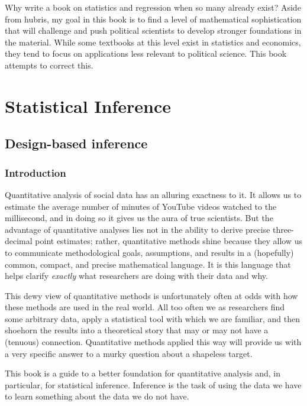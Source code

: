 \documentclass[
  letterpaper,
  DIV=11,
  numbers=noendperiod]{scrreprt}
\theoremstyle{plain}
\theoremstyle{definition}
\theoremstyle{definition}
\theoremstyle{remark}
\begin{document}
Why write a book on statistics and regression when so many already
exist? Aside from hubris, my goal in this book is to find a level of
mathematical sophistication that will challenge and push political
scientists to develop stronger foundations in the material. While some
textbooks at this level exist in statistics and economics, they tend to
focus on applications less relevant to political science. This book
attempts to correct this.

\part{Statistical Inference}

\hypertarget{design-based-inference}{%
\chapter{Design-based inference}\label{design-based-inference}}

\hypertarget{introduction-1}{%
\section{Introduction}\label{introduction-1}}

Quantitative analysis of social data has an alluring exactness to it. It
allows us to estimate the average number of minutes of YouTube videos
watched to the millisecond, and in doing so it gives us the aura of true
scientists. But the advantage of quantitative analyses lies not in the
ability to derive precise three-decimal point estimates; rather,
quantitative methods shine because they allow us to communicate
methodological goals, assumptions, and results in a (hopefully) common,
compact, and precise mathematical language. It is this language that
helps clarify \emph{exactly} what researchers are doing with their data
and why.

This dewy view of quantitative methods is unfortunately often at odds
with how these methods are used in the real world. All too often we as
researchers find some arbitrary data, apply a statistical tool with
which we are familiar, and then shoehorn the results into a theoretical
story that may or may not have a (tenuous) connection. Quantitative
methods applied this way will provide us with a very specific answer to
a murky question about a shapeless target.

This book is a guide to a better foundation for quantitative analysis
and, in particular, for statistical inference. Inference is the task of
using the data we have to learn something about the data we do not have.
\end{document}

